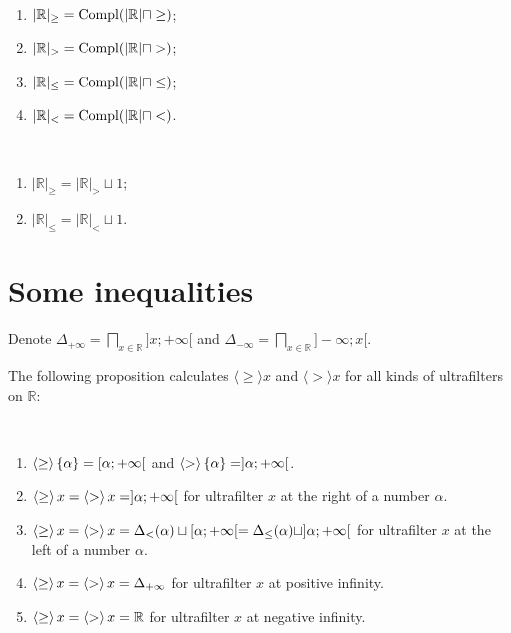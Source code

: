 \begin{cor}
~
\begin{enumerate}
\item $|\mathbb{R}|_{\geq} = \operatorname{Compl}(|\mathbb{R}| \sqcap \geq)$;
\item $|\mathbb{R}|_{>} = \operatorname{Compl}(|\mathbb{R}| \sqcap >)$;
\item $|\mathbb{R}|_{\leq} = \operatorname{Compl}(|\mathbb{R}| \sqcap \leq)$;
\item $|\mathbb{R}|_{<} = \operatorname{Compl}(|\mathbb{R}| \sqcap <)$.
\end{enumerate}
\end{cor}

\begin{obvious}
~ 
\begin{enumerate}
\item $|\mathbb{R}|_{\geq} = |\mathbb{R}|_{>} \sqcup 1$;
\item $|\mathbb{R}|_{\leq} = |\mathbb{R}|_{<} \sqcup 1$.
\end{enumerate}
\end{obvious}

\section{Some inequalities}


Denote $\Delta_{+ \infty} = \bigsqcap_{x \in \mathbb{R}}] x ; + \infty [$ and
$\Delta_{- \infty} = \bigsqcap_{x \in \mathbb{R}}] - \infty ; x [$.

The following proposition calculates $\langle \geq \rangle x$ and $\langle > \rangle x$ for all
kinds of ultrafilters on $\mathbb{R}$:

\begin{prop}
~
\begin{enumerate}
\item\label{g-uf-v-triv} $\left\langle \geq\right\rangle \{ \alpha \} = [\alpha ; + \infty [$ and
  $\left\langle >\right\rangle \{ \alpha \} = ]\alpha ; + \infty [$.
\item\label{g-uf-v-right} $\left\langle \geq\right\rangle x = \left\langle >\right\rangle x = ] \alpha ; + \infty [$
  for ultrafilter $x$ at the right of a number $\alpha$.
\item\label{g-uf-v-left} $\left\langle \geq\right\rangle x = \left\langle >\right\rangle x = \Delta_{<} (\alpha) \sqcup [\alpha ; + \infty [=
  \Delta_{\leq} (\alpha) \sqcup] \alpha ; + \infty [$ for ultrafilter $x$ at the left of a number $\alpha$.
\item\label{g-uf-v-posinf} $\left\langle \geq\right\rangle x = \left\langle >\right\rangle x = \Delta_{+ \infty}$ for
  ultrafilter $x$ at positive infinity.
\item\label{g-uf-v-neginf} $\left\langle \geq\right\rangle x = \left\langle >\right\rangle x = \mathbb{R}$ for
  ultrafilter $x$ at negative infinity.
\end{enumerate}
\end{prop}

